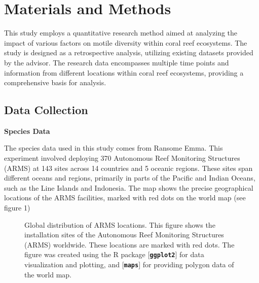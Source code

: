 \documentclass[a4paper, 11]{article}
\begin{document}
\section{Materials and Methods}

This study employs a quantitative research method aimed at analyzing the impact of various factors on motile diversity within coral reef ecosystems. The study is designed as a retrospective analysis, utilizing existing datasets provided by the advisor. The research data encompasses multiple time points and information from different locations within coral reef ecosystems, providing a comprehensive basis for analysis.

\subsection{Data Collection}

\noindent\textbf{Species Data}

The species data used in this study comes from Ransome Emma. This experiment involved deploying 370 Autonomous Reef Monitoring Structures (ARMS) at 143 sites across 14 countries and 5 oceanic regions. These sites span different oceans and regions, primarily in parts of the Pacific and Indian Oceans, such as the Line Islands and Indonesia. The map shows the precise geographical locations of the ARMS facilities, marked with red dots on the world map (see figure 1)

\begin{figure}[htbp]
    \centering
    \caption{Global distribution of ARMS locations. This figure shows the installation sites of the Autonomous Reef Monitoring Structures (ARMS) worldwide. These locations are marked with red dots. The figure was created using the R package [\textbf{\texttt{ggplot2}}] for data visualization and plotting, and [\textbf{\texttt{maps}}] for providing polygon data of the world map.}
\end{figure}
\end{document}
